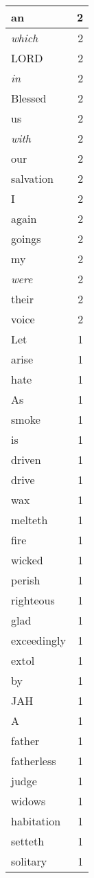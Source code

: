 \begin{center}
\begin{longtable}{l|r}
an & 2 \\ \hline
\emph{which} & 2 \\ \hline
LORD & 2 \\ \hline
\emph{in} & 2 \\ \hline
Blessed & 2 \\ \hline
us & 2 \\ \hline
\emph{with} & 2 \\ \hline
our & 2 \\ \hline
salvation & 2 \\ \hline
I & 2 \\ \hline
again & 2 \\ \hline
goings & 2 \\ \hline
my & 2 \\ \hline
\emph{were} & 2 \\ \hline
their & 2 \\ \hline
voice & 2 \\ \hline
Let & 1 \\ \hline
arise & 1 \\ \hline
hate & 1 \\ \hline
As & 1 \\ \hline
smoke & 1 \\ \hline
is & 1 \\ \hline
driven & 1 \\ \hline
drive & 1 \\ \hline
wax & 1 \\ \hline
melteth & 1 \\ \hline
fire & 1 \\ \hline
wicked & 1 \\ \hline
perish & 1 \\ \hline
righteous & 1 \\ \hline
glad & 1 \\ \hline
exceedingly & 1 \\ \hline
extol & 1 \\ \hline
by & 1 \\ \hline
JAH & 1 \\ \hline
A & 1 \\ \hline
father & 1 \\ \hline
fatherless & 1 \\ \hline
judge & 1 \\ \hline
widows & 1 \\ \hline
habitation & 1 \\ \hline
setteth & 1 \\ \hline
solitary & 1 \\ \hline

\end{longtable}
\end{center}
